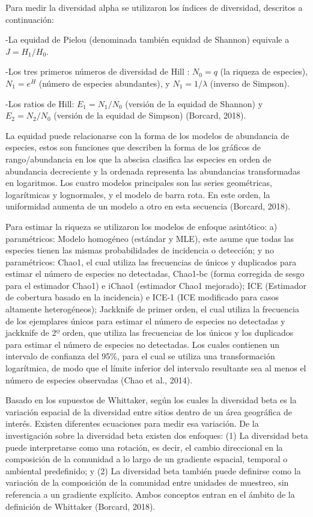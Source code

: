 \documentclass[11pt,]{article}
\begin{document}
Para medir la diversidad alpha se utilizaron los índices de diversidad,
descritos a continuación:

-La equidad de Pielou (denominada también equidad de Shannon) equivale a
\(J=H_1/H_0\).

-Los tres primeros números de diversidad de Hill : \(N_0 =q\) (la
riqueza de especies), \(N_1 = e^H\) (número de especies abundantes), y
\(N_1 = 1/\)\(\lambda\) (inverso de Simpson).

-Los ratios de Hill: \(E_1 = N_1/N_0\) (versión de la equidad de
Shannon) y \(E_2 = N_2/N_0\) (versión de la equidad de Simpson)
(Borcard, 2018).

La equidad puede relacionarse con la forma de los modelos de abundancia
de especies, estos son funciones que describen la forma de los gráficos
de rango/abundancia en los que la abscisa clasifica las especies en
orden de abundancia decreciente y la ordenada representa las abundancias
transformadas en logaritmos. Los cuatro modelos principales son las
series geométricas, logarítmicas y lognormales, y el modelo de barra
rota. En este orden, la uniformidad aumenta de un modelo a otro en esta
secuencia (Borcard, 2018).

Para estimar la riqueza se utilizaron los modelos de enfoque asintótico:
a) paramétricos: Modelo homogéneo (estándar y MLE), este asume que todas
las especies tienen las mismas probabilidades de incidencia o detección;
y no paramétricos: Chao1, el cual utiliza las frecuencias de únicos y
duplicados para estimar el número de especies no detectadas, Chao1-bc
(forma corregida de sesgo para el estimador Chao1) e iChao1 (estimador
Chao1 mejorado); ICE (Estimador de cobertura basado en la incidencia) e
ICE-1 (ICE modificado para casos altamente heterogéneos); Jackknife de
primer orden, el cual utiliza la frecuencia de los ejemplares únicos
para estimar el número de especies no detectadas y jackknife de 2º
orden, que utiliza las frecuencias de los únicos y los duplicados para
estimar el número de especies no detectadas. Los cuales contienen un
intervalo de confianza del 95\%, para el cual se utiliza una
transformación logarítmica, de modo que el límite inferior del intervalo
resultante sea al menos el número de especies observadas (Chao et al.,
2014).

Basado en los supuestos de Whittaker, según los cuales la diversidad
beta es la variación espacial de la diversidad entre sitios dentro de un
área geográfica de interés. Existen diferentes ecuaciones para medir esa
variación. De la investigación sobre la diversidad beta existen dos
enfoques: (1) La diversidad beta puede interpretarse como una rotación,
es decir, el cambio direccional en la composición de la comunidad a lo
largo de un gradiente espacial, temporal o ambiental predefinido; y (2)
La diversidad beta también puede definirse como la variación de la
composición de la comunidad entre unidades de muestreo, sin referencia a
un gradiente explícito. Ambos conceptos entran en el ámbito de la
definición de Whittaker (Borcard, 2018).
\end{document}
